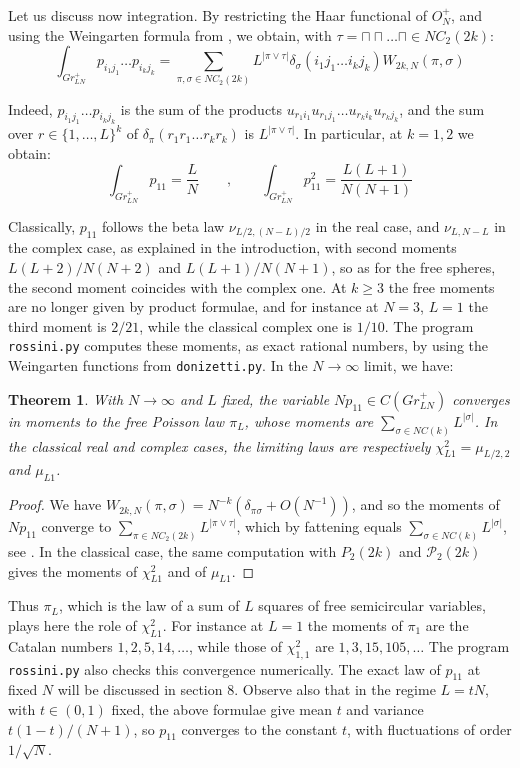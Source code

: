 \documentclass[11pt]{article}
\theoremstyle{plain}
\newtheorem{theorem}{Theorem}[section]
\begin{document}
\bigskip

Let us discuss now integration. By restricting the Haar functional of $O_N^+$, and using the Weingarten formula from \cite{ba1}, we obtain, with $\tau=\sqcap\sqcap\ldots\sqcap\in NC_2(2k)$:
$$\int_{Gr^+_{LN}}p_{i_1j_1}\ldots p_{i_kj_k}=\sum_{\pi,\sigma\in NC_2(2k)}L^{|\pi\vee\tau|}\delta_\sigma(i_1j_1\ldots i_kj_k)W_{2k,N}(\pi,\sigma)$$

Indeed, $p_{i_1j_1}\ldots p_{i_kj_k}$ is the sum of the products $u_{r_1i_1}u_{r_1j_1}\ldots u_{r_ki_k}u_{r_kj_k}$, and the sum over $r\in\{1,\ldots,L\}^k$ of $\delta_\pi(r_1r_1\ldots r_kr_k)$ is $L^{|\pi\vee\tau|}$. In particular, at $k=1,2$ we obtain:
$$\int_{Gr^+_{LN}}p_{11}=\frac{L}{N}\qquad,\qquad
\int_{Gr^+_{LN}}p_{11}^2=\frac{L(L+1)}{N(N+1)}$$

Classically, $p_{11}$ follows the beta law $\nu_{L/2,(N-L)/2}$ in the real case, and $\nu_{L,N-L}$ in the complex case, as explained in the introduction, with second moments $L(L+2)/N(N+2)$ and $L(L+1)/N(N+1)$, so as for the free spheres, the second moment coincides with the complex one. At $k\geq3$ the free moments are no longer given by product formulae, and for instance at $N=3$, $L=1$ the third moment is $2/21$, while the classical complex one is $1/10$. The program {\tt rossini.py} computes these moments, as exact rational numbers, by using the Weingarten functions from {\tt donizetti.py}. In the $N\to\infty$ limit, we have:

\begin{theorem}
\label{thm:poisson}
With $N\to\infty$ and $L$ fixed, the variable $Np_{11}\in C(Gr^+_{LN})$ converges in moments to the free Poisson law $\pi_L$, whose moments are $\sum_{\sigma\in NC(k)}L^{|\sigma|}$. In the classical real and complex cases, the limiting laws are respectively $\chi^2_{L1}=\mu_{L/2,2}$ and $\mu_{L1}$.
\end{theorem}

\begin{proof}
We have $W_{2k,N}(\pi,\sigma)=N^{-k}(\delta_{\pi\sigma}+O(N^{-1}))$, and so the moments of $Np_{11}$ converge to $\sum_{\pi\in NC_2(2k)}L^{|\pi\vee\tau|}$, which by fattening equals $\sum_{\sigma\in NC(k)}L^{|\sigma|}$, see \cite{nsp}. In the classical case, the same computation with $P_2(2k)$ and $\mathcal P_2(2k)$ gives the moments of $\chi^2_{L1}$ and of $\mu_{L1}$.
\end{proof}

Thus $\pi_L$, which is the law of a sum of $L$ squares of free semicircular variables, plays here the role of $\chi^2_{L1}$. For instance at $L=1$ the moments of $\pi_1$ are the Catalan numbers $1,2,5,14,\ldots$, while those of $\chi^2_{1,1}$ are $1,3,15,105,\ldots$ The program {\tt rossini.py} also checks this convergence numerically. The exact law of $p_{11}$ at fixed $N$ will be discussed in section 8. Observe also that in the regime $L=tN$, with $t\in(0,1)$ fixed, the above formulae give mean $t$ and variance $t(1-t)/(N+1)$, so $p_{11}$ converges to the constant $t$, with fluctuations of order $1/\sqrt{N}$.
\end{document}
